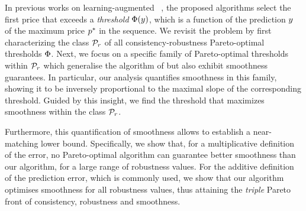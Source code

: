 In previous works on learning-augmented \OMS{}~\citep{sun_pareto-optimal_2021, benomar2025tradeoffs}, the proposed algorithms select the first price that exceeds a {\em threshold} $\Phi(y)$, which is a function of the prediction $y$ of the maximum price $p^*$ in the sequence.
We revisit the problem by first characterizing the class $\mathcal{P}_r$ of all consistency-robustness Pareto-optimal thresholds $\Phi$. 
Next, we focus on a specific family of Pareto-optimal thresholds within $\mathcal{P}_r$ which generalise the algorithm of \citet{sun_pareto-optimal_2021} but also exhibit smoothness guarantees. In particular, our analysis quantifies smoothness in this family, showing it to be inversely proportional to the maximal slope of the corresponding threshold. Guided by this insight, we find the threshold that maximizes smoothness within the class
$\mathcal{P}_r$.



Furthermore, this quantification of smoothness allows to establish a near-matching lower bound. Specifically, we show that, for a multiplicative definition of the error, no Pareto-optimal algorithm can guarantee better smoothness than our algorithm, for a large range of robustness values. For the additive definition of the prediction error, which is commonly used, we show that our algorithm optimises smoothness for all robustness values, thus attaining the  {\em triple} Pareto front of consistency, robustness and smoothness.






